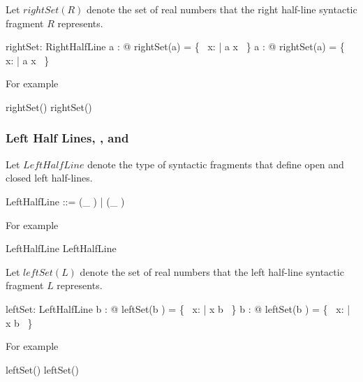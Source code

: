 \documentclass[11pt, oneside]{article}
\begin{document}
Let $rightSet(R)$ denote the set of real numbers that the right half-line syntactic fragment $R$ represents.

\begin{axdef}
	rightSet: RightHalfLine \fun \power \R
\where
	\forall a : \R @ rightSet(\openLowerBound a) = \{~ x: \R | a \ltR x ~\}
\also
	\forall a : \R @ rightSet(\closedLowerBound a) = \{~ x: \R | a \leR x ~\}
\end{axdef}

For example

\begin{zed}
	\zeroR \notin rightSet(\openLowerBound \zeroR)
\also
	\oneR \in rightSet(\closedLowerBound \oneR)
\end{zed}

\subsubsection{Left Half Lines, , and }

Let $LeftHalfLine$ denote the type of syntactic fragments that define open and closed left half-lines.

\begin{zed}
	LeftHalfLine ::= (\_ \openUpperBound)  \ldata \R \rdata | (\_ \closedUpperBound)  \ldata \R \rdata
\end{zed}

For example

\begin{zed}
	\zeroR \openUpperBound \in LeftHalfLine
\also
	\oneR \closedUpperBound \in LeftHalfLine
\end{zed}

Let $leftSet(L)$ denote the set of real numbers that the left half-line syntactic fragment $L$ represents.

\begin{axdef}
	leftSet: LeftHalfLine \fun \power \R
\where
	\forall b : \R @ leftSet(b \openUpperBound) = \{~ x: \R | x \ltR b ~\}
\also
	\forall b : \R @ leftSet(b \closedUpperBound) = \{~ x: \R | x \leR b ~\}
\end{axdef}

For example

\begin{zed}
	\zeroR \notin leftSet(\zeroR \openUpperBound)
\also
	\oneR \in leftSet(\oneR \closedUpperBound)
\end{zed}

\subsubsection{}
\end{document}
